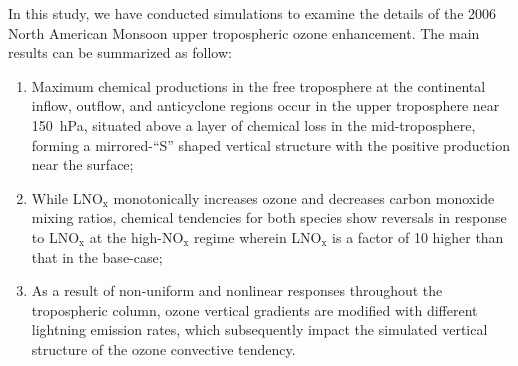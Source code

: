 In this study, we have conducted simulations to examine the details of the
2006 North American Monsoon upper tropospheric ozone enhancement.
The main results can be summarized as follow:
\begin{enumerate}
\item Maximum chemical productions in the free troposphere at the continental
inflow, outflow, and anticyclone regions occur in the upper troposphere near
150~hPa, situated above a layer of chemical loss in the mid-troposphere, forming
a mirrored-``S'' shaped vertical structure with the positive production near the surface;
\item While LNO$_\mathrm{x}$ monotonically increases ozone and decreases
carbon monoxide mixing ratios, chemical tendencies for both species show reversals in
response to LNO$_\mathrm{x}$ at the high-NO$_\mathrm{x}$ regime wherein
LNO$_{\mathrm{x}}$ is a factor of 10 higher than that in the base-case;
\item As a result of non-uniform and nonlinear responses throughout the tropospheric column,
ozone vertical gradients are modified with different lightning emission rates, which subsequently impact the
simulated vertical structure of the ozone convective tendency.

\end{enumerate}

